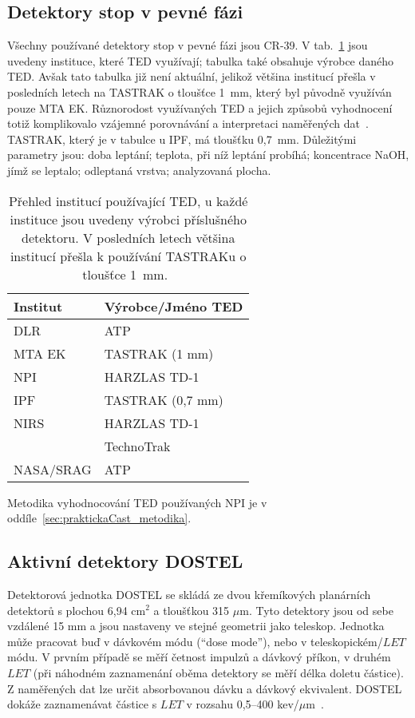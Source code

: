 \subsection{Detektory stop v pevné fázi}
Všechny používané detektory stop v pevné fázi jsou CR-39. V tab.~\ref{tab:dosis_pouzivaneTED} jsou uvedeny instituce, které TED využívají; tabulka také obsahuje výrobce daného TED. Avšak tato tabulka již není aktuální, jelikož většina institucí přešla v posledních letech na TASTRAK o tloušťce 1~mm, který byl původně využíván pouze MTA EK. Různorodost využívaných TED a jejich způsobů vyhodnocení totiž komplikovalo vzájemné porovnávání a interpretaci naměřených dat~\cite{cesky}. TASTRAK, který je v tabulce u IPF, má tloušťku 0,7~mm. Důležitými parametry jsou: doba leptání; teplota, při níž leptání probíhá; koncentrace NaOH, jímž se leptalo; odleptaná vrstva; analyzovaná plocha.
\begin{table}[h]
  \def\arraystretch{0.8}
  \centering
  \caption{Přehled institucí používající TED, u každé instituce jsou uvedeny výrobci příslušného detektoru. V posledních letech většina institucí přešla k používání TASTRAKu o tloušťce 1~mm.~\cite{dosis}}
  \label{tab:dosis_pouzivaneTED}
  \begin{tabular}{ll}
	\toprule
	Institut& Výrobce/Jméno TED\\
	\midrule
	DLR&ATP\\
	MTA EK&TASTRAK (1 mm)\\
	NPI&HARZLAS TD-1\\
	IPF&TASTRAK (0,7 mm)\\ 
	NIRS&HARZLAS TD-1\\
		&TechnoTrak\\
	NASA/SRAG&ATP\\
	\bottomrule
  \end{tabular}
\end{table}

Metodika vyhodnocování TED používaných NPI je v oddíle~\ref{sec:praktickaCast_metodika}.

\subsection{Aktivní detektory DOSTEL}\label{experimentDosis_activeDetectors}
Detektorová jednotka DOSTEL se skládá ze dvou křemíkových planárních detektorů s plochou  6,94 cm$^2$ a tloušťkou 315 $\mu$m. Tyto detektory jsou od sebe vzdálené 15 mm a jsou nastaveny ve stejné geometrii jako teleskop. Jednotka může pracovat buď v dávkovém módu (``dose mode''), nebo v teleskopickém/$\mathit{LET}$ módu. V prvním případě se měří četnost impulzů a dávkový příkon, v druhém $\mathit{LET}$ (při náhodném zaznamenání oběma detektory se měří délka doletu částice). Z naměřených dat lze určit absorbovanou dávku a dávkový ekvivalent. DOSTEL dokáže zaznamenávat částice s $\mathit{LET}$ v rozsahu 0,5--400 kev/$\mu$m~\cite{activeDetectors}. 

